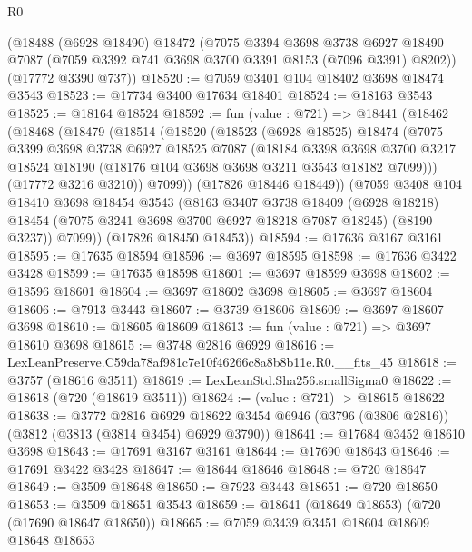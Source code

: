 \begin{lexlean}{R0}
\begin{coremodule}
    (@18488
      (@6928 @18490)
      @18472
      (@7075
        @3394
        @3698
        @3738
        @6927
        @18490
        @7087
        (@7059 @3392 @741 @3698 @3700 @3391 @8153 (@7096 @3391) @8202))
      (@17772 @3390 @737))
@18520 := @7059 @3401 @104 @18402 @3698 @18474 @3543
@18523 := @17734 @3400 @17634 @18401
@18524 := @18163 @3543
@18525 := @18164 @18524
@18592 := fun (value : @721) =>
  @18441
    (@18462
      (@18468
        (@18479
          (@18514
            (@18520
              (@18523
                (@6928 @18525)
                @18474
                (@7075
                  @3399
                  @3698
                  @3738
                  @6927
                  @18525
                  @7087
                  (@18184
                    @3398
                    @3698
                    @3700
                    @3217
                    @18524
                    @18190
                    (@18176 @104 @3698 @3698 @3211 @3543 @18182 @7099)))
                (@17772 @3216 @3210))
              @7099))
          (@17826 @18446 @18449))
        (@7059
          @3408
          @104
          @18410
          @3698
          @18454
          @3543
          (@8163
            @3407
            @3738
            @18409
            (@6928 @18218)
            @18454
            (@7075 @3241 @3698 @3700 @6927 @18218 @7087 @18245)
            (@8190 @3237))
          @7099))
      (@17826 @18450 @18453))
@18594 := @17636 @3167 @3161
@18595 := @17635 @18594
@18596 := @3697 @18595
@18598 := @17636 @3422 @3428
@18599 := @17635 @18598
@18601 := @3697 @18599 @3698
@18602 := @18596 @18601
@18604 := @3697 @18602 @3698
@18605 := @3697 @18604
@18606 := @7913 @3443
@18607 := @3739 @18606
@18609 := @3697 @18607 @3698
@18610 := @18605 @18609
@18613 := fun (value : @721) => @3697 @18610 @3698
@18615 := @3748 @2816 @6929
@18616 := LexLeanPreserve.C59da78af981c7e10f46266c8a8b8b11e.R0.__fits_45
@18618 := @3757 (@18616 @3511)
@18619 := LexLeanStd.Sha256.smallSigma0
@18622 := @18618 (@720 (@18619 @3511))
@18624 := (value : @721) -> @18615 @18622
@18638 := @3772
    @2816
    @6929
    @18622
    @3454
    @6946
    (@3796 (@3806 @2816))
    (@3812 (@3813 (@3814 @3454) @6929 @3790))
@18641 := @17684 @3452 @18610 @3698
@18643 := @17691 @3167 @3161
@18644 := @17690 @18643
@18646 := @17691 @3422 @3428
@18647 := @18644 @18646
@18648 := @720 @18647
@18649 := @3509 @18648
@18650 := @7923 @3443
@18651 := @720 @18650
@18653 := @3509 @18651 @3543
@18659 := @18641 (@18649 @18653) (@720 (@17690 @18647 @18650))
@18665 := @7059 @3439 @3451 @18604 @18609 @18648 @18653

\end{coremodule}
\end{lexlean}
